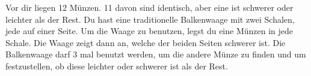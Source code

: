 \documentclass{uebung_cs}
\begin{document}
\begin{aufgabe}
	Vor dir liegen 12 Münzen. 11 davon sind identisch, aber eine ist schwerer oder leichter als der Rest. Du hast eine traditionelle Balkenwaage mit zwei Schalen, jede auf einer Seite. Um die Waage zu benutzen, legst du eine Münzen in jede Schale. Die Waage zeigt dann an, welche der beiden Seiten schwerer ist. Die Balkenwaage darf 3 mal benutzt werden, um die andere Münze zu finden und um festzustellen, ob diese leichter oder schwerer ist als der Rest.
	
\end{aufgabe}
\end{document}
